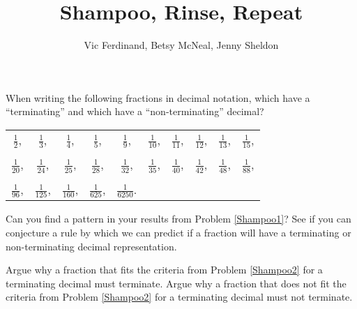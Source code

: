 \documentclass{ximera}
\title{Shampoo, Rinse, Repeat}
\author{Vic Ferdinand, Betsy McNeal, Jenny Sheldon}
\begin{document}
\begin{abstract} \end{abstract}
\maketitle


\begin{problem}\label{Shampoo1}

When writing the following fractions in decimal notation, which have a
``terminating'' and which have a ``non-terminating'' decimal?


\vspace*{0.5cm}

\begin{tabular}{c c c c c c c c c c}

$\displaystyle \frac{1}{2}$, & $\displaystyle \frac{1}{3}$, & $\displaystyle \frac{1}{4}$, & $\displaystyle \frac{1}{5}$, & $\displaystyle \frac{1}{9}$, & $\displaystyle \frac{1}{10}$, & $\displaystyle \frac{1}{11}$, & $\displaystyle \frac{1}{12}$, & $\displaystyle \frac{1}{13}$, & $\displaystyle \frac{1}{15}$,\\
\\
$\displaystyle \frac{1}{20}$, & $\displaystyle \frac{1}{24}$, & $\displaystyle \frac{1}{25}$, & $\displaystyle \frac{1}{28}$, & $\displaystyle \frac{1}{32}$, & $\displaystyle \frac{1}{35}$, & $\displaystyle \frac{1}{40}$, & $\displaystyle \frac{1}{42}$, & $\displaystyle \frac{1}{48}$, & $\displaystyle \frac{1}{88}$,\\
\\
$\displaystyle \frac{1}{96}$, & $\displaystyle \frac{1}{125}$, & $\displaystyle \frac{1}{160}$, & $\displaystyle \frac{1}{625}$, & $\displaystyle \frac{1}{6250}$.\\

\end{tabular}
\end{problem}

\begin{problem}\label{Shampoo2}
Can you find a pattern in your results from Problem \ref{Shampoo1}? See if you can
conjecture a rule by which we can predict if a fraction will have a
terminating or non-terminating decimal representation.

\end{problem}


\begin{problem}\label{Shampoo3}
Argue why a fraction that fits the criteria from Problem \ref{Shampoo2} for a
terminating decimal must terminate. Argue why a fraction that does not
fit the criteria from Problem \ref{Shampoo2} for a terminating decimal must not
terminate.
\end{problem}
\end{document}
